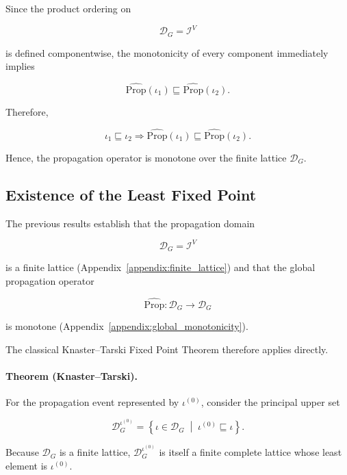 \documentclass[10pt]{article}
\begin{document}
	Since the product ordering on
	
	\[
	\mathcal D_G
	=
	\mathcal I^{V}
	\]
	
	is defined componentwise, the monotonicity of every component immediately
	implies
	
	\[
	\widehat{\mathrm{Prop}}(\iota_1)
	\sqsubseteq
	\widehat{\mathrm{Prop}}(\iota_2).
	\]
	
	Therefore,
	
	\begin{equation}
		\label{eq:global_monotonicity}
		\iota_1
		\sqsubseteq
		\iota_2
		\Longrightarrow
		\widehat{\mathrm{Prop}}(\iota_1)
		\sqsubseteq
		\widehat{\mathrm{Prop}}(\iota_2).
	\end{equation}
	
	Hence, the propagation operator is monotone over the finite lattice
	$\mathcal D_G$.
	
	\subsection{Existence of the Least Fixed Point}
	
	The previous results establish that the propagation domain
	
	\[
	\mathcal D_G
	=
	\mathcal I^{V}
	\]
	
	is a finite lattice (Appendix~\ref{appendix:finite_lattice}) and that the global
	propagation operator
	
	\[
	\widehat{\mathrm{Prop}}
	:
	\mathcal D_G
	\rightarrow
	\mathcal D_G
	\]
	
	is monotone (Appendix~\ref{appendix:global_monotonicity}).
	
	The classical Knaster--Tarski Fixed Point Theorem therefore applies directly.
	
	\paragraph{Theorem (Knaster--Tarski).}
	For the propagation event represented by $\iota^{(0)}$, consider the principal
	upper set
	
	\begin{equation}
		\mathcal D_G^{\iota^{(0)}}
		=
		\left\{
		\iota\in\mathcal D_G
		\;\middle|\;
		\iota^{(0)}
		\sqsubseteq
		\iota
		\right\}.
		\label{eq:initial_upper_domain}
	\end{equation}
	
	Because $\mathcal D_G$ is a finite lattice,
	$\mathcal D_G^{\iota^{(0)}}$ is itself a finite complete lattice whose least
	element is $\iota^{(0)}$.
	
\end{document}
